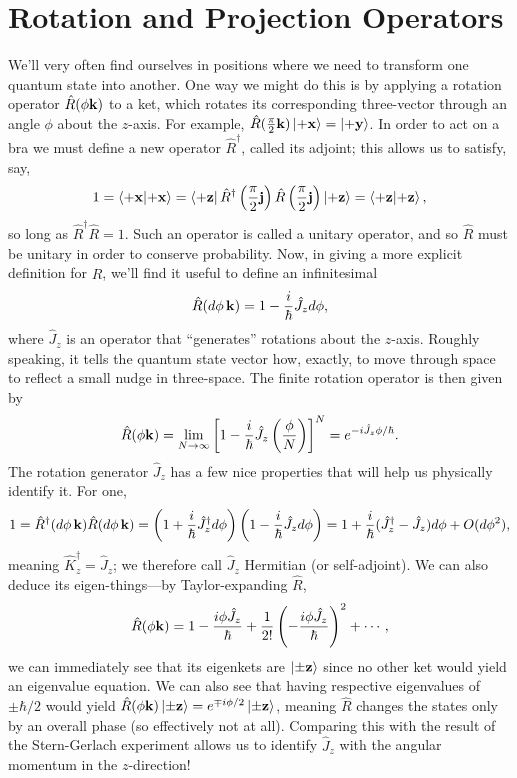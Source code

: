 \documentclass[../p116main.tex]{subfiles}
\begin{document}
\section{Rotation and Projection Operators}
We'll very often find ourselves in positions where we need to transform one quantum state into another.
One way we might do this is by applying a rotation operator $\hat R(\phi \mathbf{k})$ to a ket, which rotates its corresponding three-vector through an angle $\phi$ about the $z$-axis.
For example, $\hat R(\frac{\pi}{2} \mathbf{k}) \left| +\mathbf{x} \right> = \left| +\mathbf{y} \right>$.
In order to act on a bra we must define a new operator $\hat R^\dagger$, called its adjoint; this allows us to satisfy, say,
\[ 1 = \left< +\mathbf{x} \middle| +\mathbf{x} \right> = \left< +\mathbf{z} \right| \hat R^\dagger \left( \frac{\pi}{2} \mathbf{j} \right) \hat R \left( \frac{\pi}{2}\mathbf{j} \right) \left| +\mathbf{z} \right> = \left< +\mathbf{z} \middle| +\mathbf{z} \right>, \]
so long as $\hat R^\dagger \hat R = 1$.
Such an operator is called a unitary operator, and so $\hat R$ must be unitary in order to conserve probability.
Now, in giving a more explicit definition for $\hat R$, we'll find it useful to define an infinitesimal
\[ \hat R(d\phi \, \mathbf{k}) = 1 - \frac{i}{\hbar} \hat J_z d\phi, \]
where $\hat J_z$ is an operator that ``generates'' rotations about the $z$-axis.
Roughly speaking, it tells the quantum state vector how, exactly, to move through space to reflect a small nudge in three-space.
The finite rotation operator is then given by
\[ \hat R(\phi \mathbf{k}) = \lim_{N \to \infty} \left[ 1 - \frac{i}{\hbar} \hat J_z \left( \frac{\phi}{N} \right) \right]^{N} = e^{-i \hat J_z \phi / \hbar}. \]
The rotation generator $\hat J_z$ has a few nice properties that will help us physically identify it.
For one,
\[ 1 = \hat R^\dagger (d\phi \, \mathbf{k}) \hat R (d\phi \, \mathbf{k}) = \left( 1 + \frac{i}{\hbar} \hat J_z^\dagger d\phi \right) \left( 1 - \frac{i}{\hbar} \hat J_z d\phi \right) = 1 + \frac{i}{\hbar} (\hat J_z^\dagger - \hat J_z) d\phi + O(d\phi^2), \]
meaning $\hat K_z^\dagger = \hat J_z$; we therefore call $\hat J_z$ Hermitian (or self-adjoint).
We can also deduce its eigen-things---by Taylor-expanding $\hat R$,
\[ \hat R(\phi \mathbf{k}) = 1 - \frac{i\phi \hat J_z}{\hbar} + \frac{1}{2!} \left( -\frac{i\phi \hat J_z}{\hbar} \right)^2 + \cdots, \]
we can immediately see that its eigenkets are $\left| \pm \mathbf{z} \right>$ since no other ket would yield an eigenvalue equation.
We can also see that having respective eigenvalues of $\pm \hbar / 2$ would yield $\hat R(\phi \mathbf{k}) \left| \pm \mathbf{z} \right> = e^{\mp i\phi / 2} \left| \pm \mathbf{z} \right>$, meaning $\hat R$ changes the states only by an overall phase (so effectively not at all).     %
Comparing this with the result of the Stern-Gerlach experiment allows us to identify $\hat J_z$ with the angular momentum in the $z$-direction!
\end{document}
